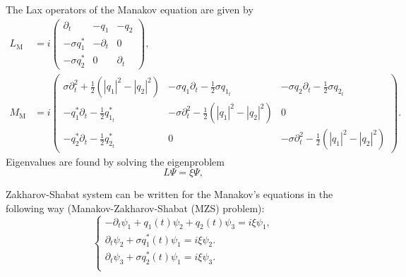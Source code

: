 The Lax operators of the Manakov equation are given by 
\begin{align}
    L_{\text{M}} &= i\begin{pmatrix} \partial_t & -q_1 & -q_2 \\
    -\sigma q_1^* & -\partial_t & 0 \\
    -\sigma q_2^* & 0 & \partial_t \end{pmatrix}, \\
    M_{\text{M}} &= i\begin{pmatrix}  \sigma \partial^2_t +  \frac{1}{2} (|q_1|^2 - |q_2|^2) & -\sigma q_1 \partial_t - \frac{1}{2} \sigma  q_{1_t} & -\sigma q_2 \partial_t - \frac{1}{2} \sigma q_{2_t} \\
    - q_1^* \partial_t - \frac{1}{2} q_{1_t}^* & - \sigma \partial^2_t -  \frac{1}{2} (|q_1|^2 - |q_2|^2) & 0 \\
    - q_2^* \partial_t - \frac{1}{2} q_{2_t}^* & 0 & - \sigma \partial^2_t -  \frac{1}{2} (|q_1|^2 - |q_2|^2) \end{pmatrix}.
\end{align}
Eigenvalues are found by solving the eigenproblem
\begin{equation}
    L\Psi = \xi \Psi {,}
\end{equation}

Zakharov-Shabat system can be written for the Manakov's equations in the following way (Manakov-Zakharov-Shabat (MZS) problem):
\begin{equation}
\left\{
\begin{aligned}
	- \partial_{t} \psi_1 + q_1(t) \psi_2 + q_2(t) \psi_3 = i \xi \psi_1, \\
	\partial_{t} \psi_2 + \sigma q_1^{*}(t) \psi_1 = i \xi \psi_2. \\
 \partial_{t} \psi_3 + \sigma q_2^{*}(t) \psi_1 = i \xi \psi_3. \\
\end{aligned}
\right.
\label{eq:zs_manakov}
\end{equation}

